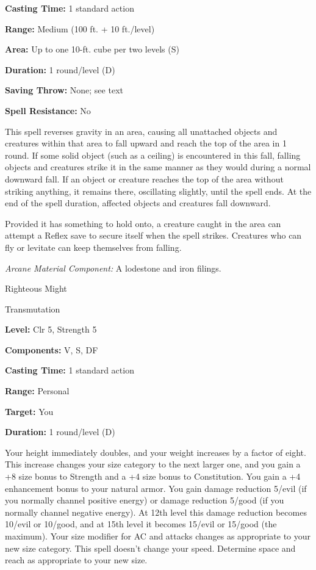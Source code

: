 \documentclass{article}
\begin{document}
\textbf{Casting Time:} 1 standard action

\textbf{Range: }Medium (100 ft. + 10 ft./level)

\textbf{Area:} Up to one 10-ft. cube per two levels (S)

\textbf{Duration:} 1 round/level (D)

\textbf{Saving Throw:} None; see text

\textbf{Spell Resistance:} No

This spell reverses gravity in an area, causing all unattached objects and creatures 
within that area to fall upward and reach the top of the area in 1 round. If some 
solid object (such as a ceiling) is encountered in this fall, falling objects and 
creatures strike it in the same manner as they would during a normal downward fall. 
If an object or creature reaches the top of the area without striking anything, 
it remains there, oscillating slightly, until the spell ends. At the end of the 
spell duration, affected objects and creatures fall downward.

Provided it has something to hold onto, a creature caught in the area can attempt 
a Reflex save to secure itself when the spell strikes. Creatures who can fly or 
levitate can keep themselves from falling.

\textit{Arcane Material Component: }A lodestone and iron filings.

\vspace{12pt}
Righteous Might

Transmutation

\textbf{Level:} Clr 5, Strength 5

\textbf{Components:} V, S, DF

\textbf{Casting Time:} 1 standard action

\textbf{Range:} Personal

\textbf{Target:} You

\textbf{Duration:} 1 round/level (D)

Your height immediately doubles, and your weight increases by a factor of eight. 
This increase changes your size category to the next larger one, and you gain a 
+8 size bonus to Strength and a +4 size bonus to Constitution. You gain a +4 enhancement 
bonus to your natural armor. You gain damage reduction 5/evil (if you normally 
channel positive energy) or damage reduction 5/good (if you normally channel negative 
energy). At 12th level this damage reduction becomes 10/evil or 10/good, and at 
15th level it becomes 15/evil or 15/good (the maximum). Your size modifier for 
AC and attacks changes as appropriate to your new size category. This spell doesn't 
change your speed.  Determine space and reach as appropriate to your new size.
\end{document}
